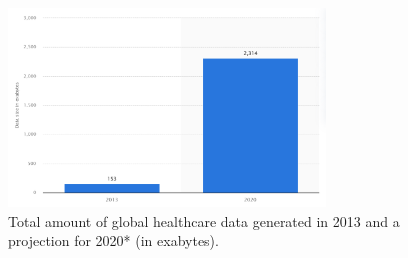 \begin{figure}[h!]
    \center
    \includegraphics[width=0.75\textwidth]{images/intro/sista.PNG}
    \caption{Total amount of global healthcare data generated in 2013 and a projection for 2020* (in exabytes).}
    \label{fig:dataGenerated}
  \end{figure}

